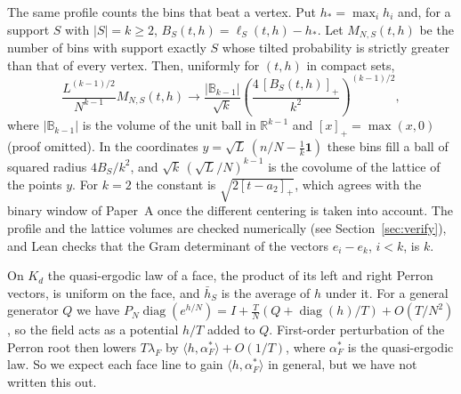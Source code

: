 \begin{remark}\label{rem:frontier-superlevel}
The same profile counts the bins that beat a vertex. Put $h_*=\max_ih_i$ and,
for a support $S$ with $|S|=k\ge2$, $B_S(t,h)=\ell_S(t,h)-h_*$. Let $M_{N,S}(t,h)$
be the number of bins with support exactly $S$ whose tilted probability is
strictly greater than that of every vertex. Then, uniformly for $(t,h)$ in
compact sets,
\[
 \frac{L^{(k-1)/2}}{N^{k-1}}M_{N,S}(t,h)
 \longrightarrow
 \frac{|\mathbb B_{k-1}|}{\sqrt k}
 \left(\frac{4\,[B_S(t,h)]_+}{k^2}\right)^{(k-1)/2},
\]
where $|\mathbb B_{k-1}|$ is the volume of the unit ball in $\mathbb R^{k-1}$
and $[x]_+=\max(x,0)$ (proof omitted). In the coordinates
$y=\sqrt L\,(n/N-\frac1k\mathbf1)$ these bins fill a ball of squared radius
$4B_S/k^2$, and $\sqrt k\,(\sqrt L/N)^{k-1}$ is the covolume of the lattice of
the points $y$. For $k=2$ the constant is $\sqrt{2[t-a_2]_+}$, which agrees with
the binary window of Paper~A once the different centering is taken into
account. The profile and the lattice volumes are checked numerically (see
Section~\ref{sec:verify}), and Lean checks that the Gram determinant of the
vectors $e_i-e_k$, $i<k$, is $k$.
\end{remark}

On $K_d$ the quasi-ergodic law of a face, the product of its left and right
Perron vectors, is uniform on the face, and $\bar h_S$ is the average
of $h$ under it. For a general generator $Q$ we have
$P_N\operatorname{diag}(e^{h/N})=I+\frac TN(Q+\operatorname{diag}(h)/T)+O(T/N^2)$,
so the field acts as a potential $h/T$ added to $Q$. First-order perturbation of
the Perron root then lowers $T\lambda_F$ by $\langle h,\alpha^*_F\rangle+O(1/T)$,
where $\alpha^*_F$ is the quasi-ergodic law. So we expect each face line to gain
$\langle h,\alpha^*_F\rangle$ in general, but we have not written this out.

